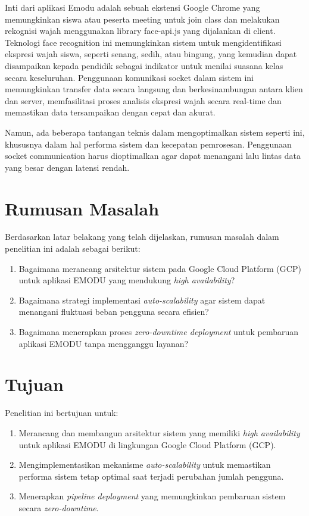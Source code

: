 Inti dari aplikasi Emodu adalah sebuah ekstensi Google Chrome yang memungkinkan siswa atau peserta meeting untuk join class dan melakukan rekognisi wajah menggunakan library face-api.js yang dijalankan di client.
Teknologi face recognition ini memungkinkan sistem untuk mengidentifikasi ekspresi wajah siswa, seperti senang, sedih, atau bingung, yang kemudian dapat disampaikan kepada pendidik sebagai indikator untuk menilai suasana kelas secara keseluruhan.
Penggunaan komunikasi socket dalam sistem ini memungkinkan transfer data secara langsung dan berkesinambungan antara klien dan server, memfasilitasi proses analisis ekspresi wajah secara real-time dan memastikan data tersampaikan dengan cepat dan akurat.

Namun, ada beberapa tantangan teknis dalam mengoptimalkan sistem seperti ini, khususnya dalam hal performa sistem dan kecepatan pemrosesan.
Penggunaan socket communication harus dioptimalkan agar dapat menangani lalu lintas data yang besar dengan latensi rendah.

\section{Rumusan Masalah}
{Berdasarkan latar belakang yang telah dijelaskan, rumusan masalah dalam penelitian ini adalah sebagai berikut:}

\begin{enumerate}
  \item
    {Bagaimana merancang arsitektur sistem pada Google Cloud Platform (GCP) untuk aplikasi EMODU yang mendukung \textit{high availability}?}
  \item
    {Bagaimana strategi implementasi \textit{auto-scalability} agar sistem dapat menangani fluktuasi beban pengguna secara efisien?}
  \item
    {Bagaimana menerapkan proses \textit{zero-downtime deployment} untuk pembaruan aplikasi EMODU tanpa mengganggu layanan?}
\end{enumerate}

\section{Tujuan}
{Penelitian ini bertujuan untuk:}

\begin{enumerate}
  \item
    {Merancang dan membangun arsitektur sistem yang memiliki \textit{high availability} untuk aplikasi EMODU di lingkungan Google Cloud Platform (GCP).}
  \item
    {Mengimplementasikan mekanisme \textit{auto-scalability} untuk memastikan performa sistem tetap optimal saat terjadi perubahan jumlah pengguna.}
  \item
    {Menerapkan \textit{pipeline deployment} yang memungkinkan pembaruan sistem secara \textit{zero-downtime}.}
\end{enumerate}

